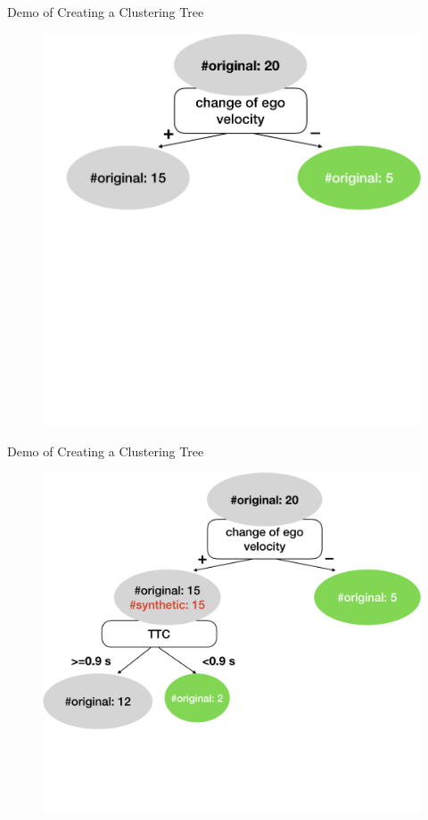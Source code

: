 \documentclass[shortpres]{beamer}
\begin{document}
  \begin{frame}{Demo of Creating a Clustering Tree}	
    \begin{figure}
      \includegraphics[height=0.6\textheight]{fig/cltree2.png}
    \end{figure}
  \end{frame}
  \begin{frame}{Demo of Creating a Clustering Tree}	
    \begin{figure}
      \includegraphics[height=0.6\textheight]{fig/cltree3.png}
    \end{figure}
  \end{frame}
\end{document}

